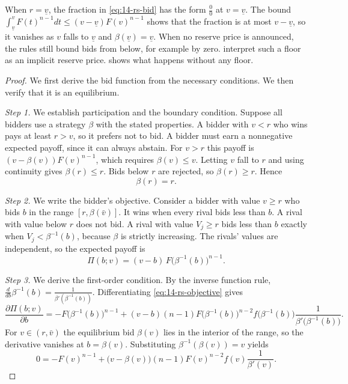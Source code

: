 When $r=\underline v$, the fraction in \eqref{eq:14-rs-bid} has the form $\frac{0}{0}$ at $v=\underline v$. The bound $\int_{\underline v}^v F(t)^{n-1}dt\le(v-\underline v)F(v)^{n-1}$ shows that the fraction is at most $v-\underline v$, so it vanishes as $v$ falls to $\underline v$ and $\beta(\underline v)=\underline v$. When no reserve price is announced, the rules still bound bids from below, for example by zero.  interpret such a floor as an implicit reserve price.  shows what happens without any floor.

\begin{proof}
We first derive the bid function from the necessary conditions. We then verify that it is an equilibrium.

\emph{Step 1.} We establish participation and the boundary condition. Suppose all bidders use a strategy $\beta$ with the stated properties. A bidder with $v<r$ who wins pays at least $r>v$, so it prefers not to bid. A bidder must earn a nonnegative expected payoff, since it can always abstain. For $v>r$ this payoff is $(v-\beta(v))F(v)^{n-1}$, which requires $\beta(v)\le v$. Letting $v$ fall to $r$ and using continuity gives $\beta(r)\le r$. Bids below $r$ are rejected, so $\beta(r)\ge r$. Hence
\[
\beta(r)=r.
\]

\emph{Step 2.} We write the bidder's objective. Consider a bidder with value $v\ge r$ who bids $b$ in the range $[r,\beta(\bar v)]$. It wins when every rival bids less than $b$. A rival with value below $r$ does not bid. A rival with value $V_j\ge r$ bids less than $b$ exactly when $V_j<\beta^{-1}(b)$, because $\beta$ is strictly increasing. The rivals' values are independent, so the expected payoff is
\begin{equation}\label{eq:14-rs-objective}
\Pi(b;v)=(v-b)\,F\big(\beta^{-1}(b)\big)^{n-1}.
\end{equation}

\emph{Step 3.} We derive the first-order condition. By the inverse function rule, $\frac{d}{db}\beta^{-1}(b)=\frac{1}{\beta'(\beta^{-1}(b))}$. Differentiating \eqref{eq:14-rs-objective} gives
\[
\frac{\partial\Pi(b;v)}{\partial b}=-F\big(\beta^{-1}(b)\big)^{n-1}+(v-b)(n-1)F\big(\beta^{-1}(b)\big)^{n-2}f\big(\beta^{-1}(b)\big)\frac{1}{\beta'\big(\beta^{-1}(b)\big)}.
\]
For $v\in(r,\bar v)$ the equilibrium bid $\beta(v)$ lies in the interior of the range, so the derivative vanishes at $b=\beta(v)$. Substituting $\beta^{-1}(\beta(v))=v$ yields
\[
0=-F(v)^{n-1}+\big(v-\beta(v)\big)(n-1)F(v)^{n-2}f(v)\frac{1}{\beta'(v)}.
\]


\end{proof}
